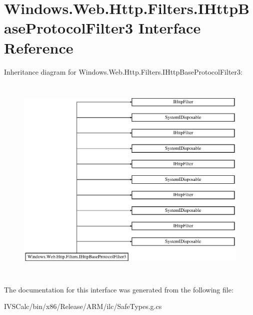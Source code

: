 \hypertarget{interface_windows_1_1_web_1_1_http_1_1_filters_1_1_i_http_base_protocol_filter3}{}\section{Windows.\+Web.\+Http.\+Filters.\+I\+Http\+Base\+Protocol\+Filter3 Interface Reference}
\label{interface_windows_1_1_web_1_1_http_1_1_filters_1_1_i_http_base_protocol_filter3}
Inheritance diagram for Windows.\+Web.\+Http.\+Filters.\+I\+Http\+Base\+Protocol\+Filter3\+:\begin{figure}[H]
\begin{center}
\leavevmode
\includegraphics[height=10.131579cm]{interface_windows_1_1_web_1_1_http_1_1_filters_1_1_i_http_base_protocol_filter3}
\end{center}
\end{figure}


The documentation for this interface was generated from the following file\+:\begin{DoxyCompactItemize}
\item 
I\+V\+S\+Calc/bin/x86/\+Release/\+A\+R\+M/ilc/Safe\+Types.\+g.\+cs\end{DoxyCompactItemize}
